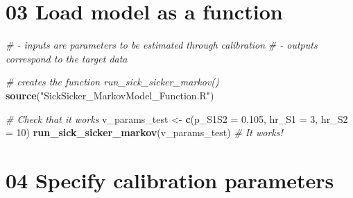 \documentclass[
]{article}
\newenvironment{Shaded}{\begin{snugshade}}{\end{snugshade}}
\newcommand{\CommentTok}[1]{\textcolor[rgb]{0.56,0.35,0.01}{\textit{#1}}}
\newcommand{\DataTypeTok}[1]{\textcolor[rgb]{0.13,0.29,0.53}{#1}}
\newcommand{\DecValTok}[1]{\textcolor[rgb]{0.00,0.00,0.81}{#1}}
\newcommand{\FloatTok}[1]{\textcolor[rgb]{0.00,0.00,0.81}{#1}}
\newcommand{\KeywordTok}[1]{\textcolor[rgb]{0.13,0.29,0.53}{\textbf{#1}}}
\newcommand{\NormalTok}[1]{#1}
\newcommand{\OperatorTok}[1]{\textcolor[rgb]{0.81,0.36,0.00}{\textbf{#1}}}
\newcommand{\StringTok}[1]{\textcolor[rgb]{0.31,0.60,0.02}{#1}}
\begin{document}
\begin{Shaded}
\end{Shaded}

\hypertarget{load-model-as-a-function}{%
\section{03 Load model as a function}\label{load-model-as-a-function}}

\begin{Shaded}
\begin{Highlighting}[]
\CommentTok{# - inputs are parameters to be estimated through calibration}
\CommentTok{# - outputs correspond to the target data}

\CommentTok{# creates the function run_sick_sicker_markov()}
\KeywordTok{source}\NormalTok{(}\StringTok{"SickSicker_MarkovModel_Function.R"}\NormalTok{)}

\CommentTok{# Check that it works}
\NormalTok{v_params_test <-}\StringTok{ }\KeywordTok{c}\NormalTok{(}\DataTypeTok{p_S1S2 =} \FloatTok{0.105}\NormalTok{, }\DataTypeTok{hr_S1 =} \DecValTok{3}\NormalTok{, }\DataTypeTok{hr_S2 =} \DecValTok{10}\NormalTok{)}
\KeywordTok{run_sick_sicker_markov}\NormalTok{(v_params_test) }\CommentTok{# It works!}
\end{Highlighting}
\end{Shaded}

\hypertarget{specify-calibration-parameters}{%
\section{04 Specify calibration
parameters}\label{specify-calibration-parameters}}
\end{document}
